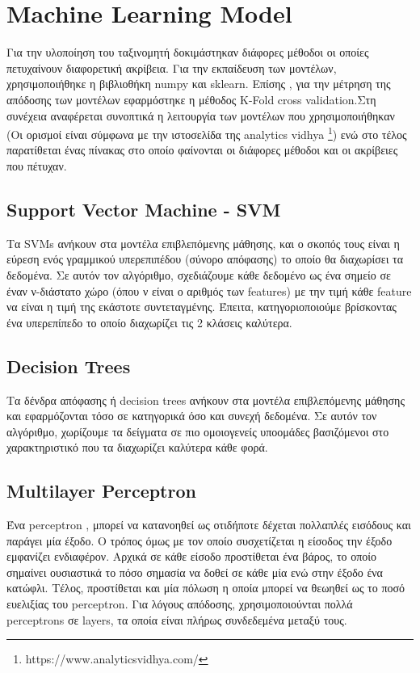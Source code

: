 \section{Machine Learning Model}

Για την υλοποίηση του ταξινομητή δοκιμάστηκαν διάφορες μέθοδοι οι οποίες πετυχαίνουν διαφορετική ακρίβεια. Για την εκπαίδευση των μοντέλων, χρησιμοποιήθηκε η βιβλιοθήκη numpy και sklearn. Επίσης , για την μέτρηση της απόδοσης των μοντέλων εφαρμόστηκε η μέθοδος K-Fold cross validation.Στη συνέχεια αναφέρεται συνοπτικά η λειτουργία των μοντέλων που χρησιμοποιήθηκαν (Οι ορισμοί είναι σύμφωνα με την ιστοσελίδα της analytics vidhya \footnote{https://www.analyticsvidhya.com/}) ενώ στο τέλος παρατίθεται ένας πίνακας στο οποίο φαίνονται οι διάφορες μέθοδοι και οι ακρίβειες που πέτυχαν.

\subsection{Support Vector Machine - SVM}

Τα SVMs ανήκουν στα μοντέλα επιβλεπόμενης μάθησης, και ο σκοπός τους είναι η εύρεση ενός γραμμικού υπερεπιπέδου (σύνορο απόφασης) το οποίο θα διαχωρίσει τα δεδομένα. Σε αυτόν τον αλγόριθμο, σχεδιάζουμε κάθε δεδομένο ως ένα σημείο σε έναν ν-διάστατο χώρο (όπου ν είναι ο αριθμός των features) με την τιμή κάθε feature να είναι η τιμή της εκάστοτε συντεταγμένης. Έπειτα, κατηγοριοποιούμε βρίσκοντας ένα υπερεπίπεδο το οποίο διαχωρίζει τις 2 κλάσεις καλύτερα.

\subsection{Decision Trees}

Τα δένδρα απόφασης ή decision trees ανήκουν στα μοντέλα επιβλεπόμενης μάθησης και εφαρμόζονται τόσο σε κατηγορικά όσο και συνεχή δεδομένα. Σε αυτόν τον αλγόριθμο, χωρίζουμε τα δείγματα σε πιο ομοιογενείς υποομάδες βασιζόμενοι στο χαρακτηριστικό που τα διαχωρίζει καλύτερα κάθε φορά.

\subsection{Multilayer Perceptron}

Ένα perceptron , μπορεί να κατανοηθεί ως οτιδήποτε δέχεται πολλαπλές εισόδους και παράγει μία έξοδο. Ο τρόπος όμως με τον οποίο συσχετίζεται η είσοδος την έξοδο εμφανίζει ενδιαφέρον. Αρχικά σε κάθε είσοδο προστίθεται ένα βάρος, το οποίο σημαίνει ουσιαστικά το πόσο σημασία να δοθεί σε κάθε μία ενώ στην έξοδο ένα κατώφλι. Τέλος, προστίθεται και μία πόλωση η οποία μπορεί να θεωηθεί ως το ποσό ευελιξίας του perceptron. Για λόγους απόδοσης, χρησιμοποιούνται πολλά perceptrons σε layers, τα οποία είναι πλήρως συνδεδεμένα μεταξύ τους.   

